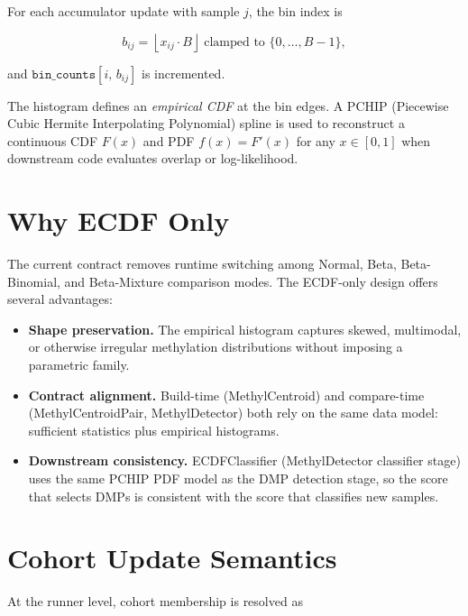 \documentclass[11pt]{article}
\begin{document}
For each accumulator update with sample \(j\), the bin index is

\begin{equation}
  b_{ij} = \left\lfloor x_{ij} \cdot B \right\rfloor
           \;\text{clamped to }\{0,\ldots,B-1\},
\end{equation}

and \(\texttt{bin\_counts}[i,\,b_{ij}]\) is incremented.

The histogram defines an \emph{empirical CDF} at the bin edges.  A PCHIP
(Piecewise Cubic Hermite Interpolating Polynomial) spline is used to
reconstruct a continuous CDF \(F(x)\) and PDF \(f(x) = F'(x)\) for any
\(x \in [0,1]\) when downstream code evaluates overlap or log-likelihood.

\section{Why ECDF Only}

The current contract removes runtime switching among Normal, Beta,
Beta-Binomial, and Beta-Mixture comparison modes.  The ECDF-only design
offers several advantages:

\begin{itemize}
  \item \textbf{Shape preservation.}  The empirical histogram captures
        skewed, multimodal, or otherwise irregular methylation distributions
        without imposing a parametric family.
  \item \textbf{Contract alignment.}  Build-time (MethylCentroid) and
        compare-time (MethylCentroidPair, MethylDetector) both rely on the
        same data model: sufficient statistics plus empirical histograms.
  \item \textbf{Downstream consistency.}  ECDFClassifier (MethylDetector
        classifier stage) uses the same PCHIP PDF model as the DMP
        detection stage, so the score that selects DMPs is consistent with
        the score that classifies new samples.
\end{itemize}

\section{Cohort Update Semantics}

At the runner level, cohort membership is resolved as
\end{document}
